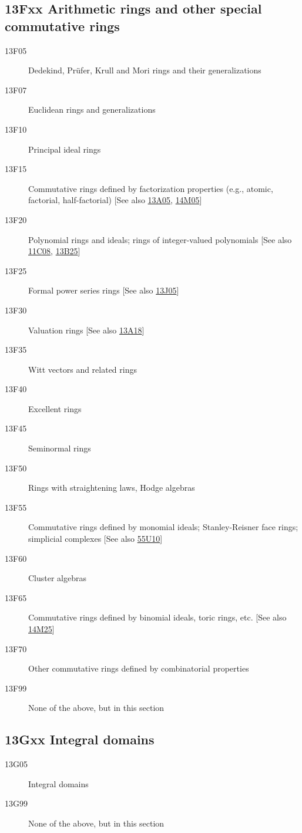 \documentclass[letterpaper]{article}
\begin{document}
\subsection*{13Fxx Arithmetic rings and other special commutative rings }\label{13Fxx}
\begin{description}          
\item [13F05]\label{13F05} Dedekind, Pr\"{u}fer, Krull and Mori rings and their generalizations
\item [13F07]\label{13F07} Euclidean rings and generalizations
\item [13F10]\label{13F10} Principal ideal rings
\item [13F15]\label{13F15} Commutative rings defined by factorization properties (e.g., atomic, factorial, half-factorial) [See also \hyperref[13A05]{13A05}, \hyperref[14M05]{14M05}]
\item [13F20]\label{13F20} Polynomial rings and ideals; rings of integer-valued polynomials [See also \hyperref[11C08]{11C08}, \hyperref[13B25]{13B25}]
\item [13F25]\label{13F25} Formal power series rings [See also \hyperref[13J05]{13J05}]
\item [13F30]\label{13F30} Valuation rings [See also \hyperref[13A18]{13A18}]
\item [13F35]\label{13F35} Witt vectors and related rings
\item [13F40]\label{13F40} Excellent rings
\item [13F45]\label{13F45} Seminormal rings
\item [13F50]\label{13F50} Rings with straightening laws, Hodge algebras
\item [13F55]\label{13F55} Commutative rings defined by monomial ideals; Stanley-Reisner face rings; simplicial complexes [See also \hyperref[55U10]{55U10}]
\item [13F60]\label{13F60} Cluster algebras
\item [13F65]\label{13F65} Commutative rings defined by binomial ideals, toric rings, etc. [See also \hyperref[14M25]{14M25}]
\item [13F70]\label{13F70} Other commutative rings defined by combinatorial properties
\item [13F99]\label{13F99} None of the above, but in this section
\end{description}          
\subsection*{13Gxx Integral domains }\label{13Gxx}
\begin{description}               
\item [13G05]\label{13G05} Integral domains
\item [13G99]\label{13G99} None of the above, but in this section
\end{description}          
\end{document}
